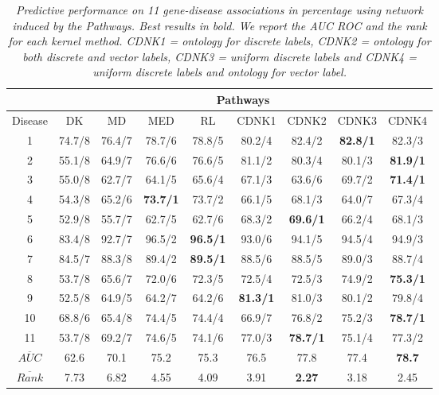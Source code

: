 \documentclass[review]{elsarticle}
\begin{document}
\begin{table}
\caption{\textit {Predictive performance on 11 gene-disease associations in percentage using network induced by the Pathways. Best results in bold. We report the AUC ROC and the rank for each kernel method.  CDNK1 = ontology for discrete labels, CDNK2 = ontology for both discrete and vector labels, CDNK3 = uniform discrete labels and CDNK4 = uniform discrete labels and ontology for vector label.}} \vspace{1em}
\centering
\setlength{\tabcolsep}{1mm}
\begin{tabular}{|c|c|c|c|c|c|c|c|c|}
\hline
         & \multicolumn{8}{c|}{\textbf{Pathways}} \\
 \hline
Disease & DK & MD & MED & RL & CDNK1 & CDNK2 & CDNK3 & CDNK4 \\

 \hline
1 & 74.7/8 & 76.4/7 & 78.7/6 & 78.8/5 & 80.2/4 & 82.4/2 & \textbf{82.8/1} & 82.3/3 \\

2 & 55.1/8 & 64.9/7 & 76.6/6 & 76.6/5 & 81.1/2 & 80.3/4 & 80.1/3 & \textbf{81.9/1} \\

3 & 55.0/8 & 62.7/7 & 64.1/5 & 65.6/4 & 67.1/3 & 63.6/6 & 69.7/2 & \textbf{71.4/1} \\

4 & 54.3/8 & 65.2/6 & \textbf{73.7/1} & 73.7/2 & 66.1/5 & 68.1/3 & 64.0/7 & 67.3/4 \\

5 & 52.9/8 & 55.7/7 & 62.7/5 & 62.7/6 & 68.3/2 & \textbf{69.6/1} & 66.2/4 & 68.1/3 \\

6 & 83.4/8 & 92.7/7 & 96.5/2 & \textbf{96.5/1} & 93.0/6 & 94.1/5 & 94.5/4 & 94.9/3 \\

7 & 84.5/7 & 88.3/8 & 89.4/2 & \textbf{89.5/1} & 88.5/6 & 88.5/5 & 89.0/3 & 88.7/4 \\

8 & 53.7/8 & 65.6/7 & 72.0/6 & 72.3/5 & 72.5/4 & 72.5/3 & 74.9/2 & \textbf{75.3/1} \\

9 & 52.5/8 & 64.9/5 & 64.2/7 & 64.2/6 & \textbf{81.3/1} & 81.0/3 & 80.1/2 & 79.8/4 \\

10 & 68.8/6 & 65.4/8 & 74.4/5 & 74.4/4 & 66.9/7 & 76.8/2 & 75.2/3 & \textbf{78.7/1} \\

11 & 53.7/8 & 69.2/7 & 74.6/5 & 74.1/6 & 77.0/3 & \textbf{78.7/1} & 75.1/4 & 77.3/2 \\

\hline
$\overline{AUC}$ & 62.6	& 70.1 & 75.2 & 75.3 & 76.5 & 77.8 & 77.4 &	\textbf{78.7}
 \\
$\overline{Rank}$ & 7.73 & 6.82 & 4.55 & 4.09 & 3.91 & \textbf{2.27} & 3.18 & 2.45 \\
 \hline 
\end{tabular}
\label{fig:cdnk-pathways}
\end{table}
\end{document}
